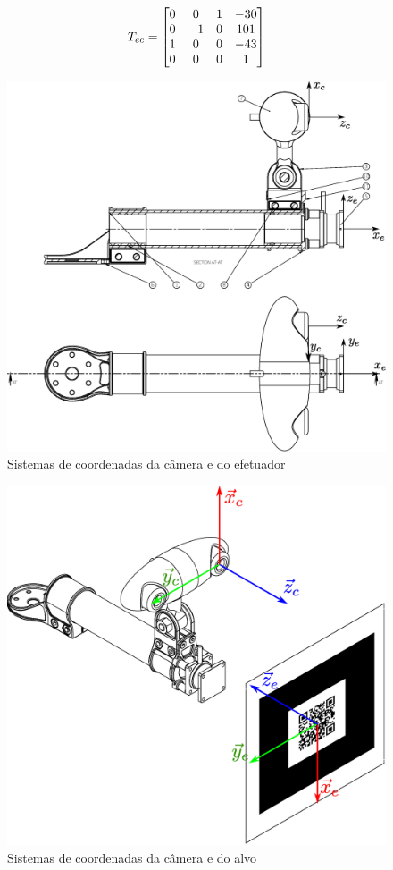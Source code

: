 \begin{equation} \label{eq:tec}
{T}_{ec} = \begin{bmatrix}
	0 & 0 & 1 & -30 \\
	0 & -1 & 0 & 101 \\
	1 &  0 & 0 & -43 \\
	0 &  0 & 0 &  1
\end{bmatrix}
\end{equation}

\begin{figure}[!h]
  \centering
  \includegraphics[width=0.8\linewidth]{./img/effector2}
  \caption{Sistemas de coordenadas da câmera e do efetuador}
  \label{fig:camera_ref}
\end{figure}

\begin{figure}[!h]
  \centering
  \includegraphics[width=0.8\linewidth]{./img/camera_target}
  \caption{Sistemas de coordenadas da câmera e do alvo}
  \label{fig:camera_target}
\end{figure}


